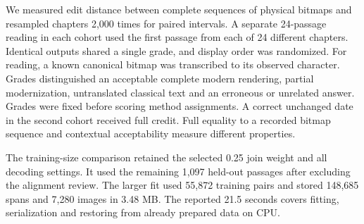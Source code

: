 We measured edit distance between complete sequences of physical bitmaps and resampled chapters 2,000 times for paired intervals. A separate 24-passage reading in each cohort used the first passage from each of 24 different chapters. Identical outputs shared a single grade, and display order was randomized. For reading, a known canonical bitmap was transcribed to its observed character. Grades distinguished an acceptable complete modern rendering, partial modernization, untranslated classical text and an erroneous or unrelated answer. Grades were fixed before scoring method assignments. A correct unchanged date in the second cohort received full credit. Full equality to a recorded bitmap sequence and contextual acceptability measure different properties.

The training-size comparison retained the selected 0.25 join weight and all decoding settings. It used the remaining 1,097 held-out passages after excluding the alignment review. The larger fit used 55,872 training pairs and stored 148,685 spans and 7,280 images in 3.48 MB. The reported 21.5 seconds covers fitting, serialization and restoring from already prepared data on CPU.
